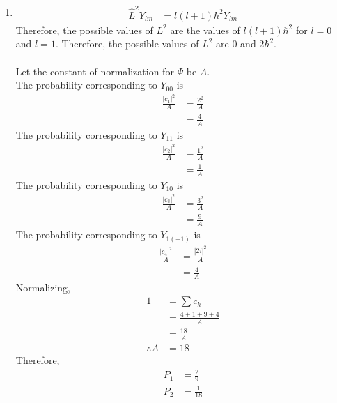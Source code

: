 \documentclass[fleqn, a4paper, 11pt, oneside]{amsart}
\theoremstyle{definition}
\theoremstyle{theorem}
\begin{document}
\begin{solution}
	\begin{enumerate}[leftmargin=*]
		\item
			\begin{align*}
				\hat{L}^2 Y_{l m} & = l (l + 1) \hbar^2 Y_{l m}
			\end{align*}
			Therefore, the possible values of $L^2$ are the values of $l (l + 1) \hbar^2$ for $l = 0$ and $l = 1$.
			Therefore, the possible values of $L^2$ are $0$ and $2 \hbar^2$.\\
			~\\
			Let the constant of normalization for $\Psi$ be $A$.\\
			The probability corresponding to $Y_{0 0}$ is
			\begin{align*}
				\frac{|c_1|^2}{A} & = \frac{2^2}{A} \\
                                                  & = \frac{4}{A}
			\end{align*}
			The probability corresponding to $Y_{1 1}$ is
			\begin{align*}
				\frac{|c_2|^2}{A} & = \frac{1^2}{A} \\
                                                  & = \frac{1}{A}
			\end{align*}
			The probability corresponding to $Y_{1 0}$ is
			\begin{align*}
				\frac{|c_3|^2}{A} & = \frac{3^2}{A} \\
                                                  & = \frac{9}{A}
			\end{align*}
			The probability corresponding to $Y_{1 (-1)}$ is
			\begin{align*}
				\frac{|c_4|^2}{A} & = \frac{|2 i|^2}{A} \\
                                                  & = \frac{4}{A}
			\end{align*}
			Normalizing,
			\begin{align*}
				1            & = \sum c_k                \\
                                             & = \frac{4 + 1 + 9 + 4}{A} \\
                                             & = \frac{18}{A}            \\
				\therefore A & = 18
			\end{align*}
			Therefore,
			\begin{align*}
				P_1 & = \frac{2}{9}  \\
				P_2 & = \frac{1}{18} \\

\end{align*}
\end{enumerate}
\end{solution}
\end{document}

